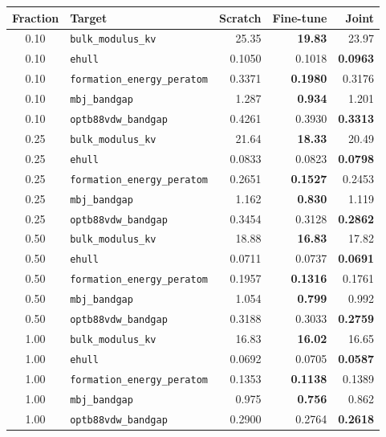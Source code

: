 \documentclass[11pt,a4paper]{article}
\begin{document}
\begin{center}
\small
\begin{tabular}{clrrr}
\toprule
Fraction & Target & Scratch & Fine-tune & Joint \\
\midrule
0.10 & \texttt{bulk\_modulus\_kv} & 25.35 & \textbf{19.83} & 23.97 \\
0.10 & \texttt{ehull} & 0.1050 & 0.1018 & \textbf{0.0963} \\
0.10 & \texttt{formation\_energy\_peratom} & 0.3371 & \textbf{0.1980} & 0.3176 \\
0.10 & \texttt{mbj\_bandgap} & 1.287 & \textbf{0.934} & 1.201 \\
0.10 & \texttt{optb88vdw\_bandgap} & 0.4261 & 0.3930 & \textbf{0.3313} \\
\midrule
0.25 & \texttt{bulk\_modulus\_kv} & 21.64 & \textbf{18.33} & 20.49 \\
0.25 & \texttt{ehull} & 0.0833 & 0.0823 & \textbf{0.0798} \\
0.25 & \texttt{formation\_energy\_peratom} & 0.2651 & \textbf{0.1527} & 0.2453 \\
0.25 & \texttt{mbj\_bandgap} & 1.162 & \textbf{0.830} & 1.119 \\
0.25 & \texttt{optb88vdw\_bandgap} & 0.3454 & 0.3128 & \textbf{0.2862} \\
\midrule
0.50 & \texttt{bulk\_modulus\_kv} & 18.88 & \textbf{16.83} & 17.82 \\
0.50 & \texttt{ehull} & 0.0711 & 0.0737 & \textbf{0.0691} \\
0.50 & \texttt{formation\_energy\_peratom} & 0.1957 & \textbf{0.1316} & 0.1761 \\
0.50 & \texttt{mbj\_bandgap} & 1.054 & \textbf{0.799} & 0.992 \\
0.50 & \texttt{optb88vdw\_bandgap} & 0.3188 & 0.3033 & \textbf{0.2759} \\
\midrule
1.00 & \texttt{bulk\_modulus\_kv} & 16.83 & \textbf{16.02} & 16.65 \\
1.00 & \texttt{ehull} & 0.0692 & 0.0705 & \textbf{0.0587} \\
1.00 & \texttt{formation\_energy\_peratom} & 0.1353 & \textbf{0.1138} & 0.1389 \\
1.00 & \texttt{mbj\_bandgap} & 0.975 & \textbf{0.756} & 0.862 \\
1.00 & \texttt{optb88vdw\_bandgap} & 0.2900 & 0.2764 & \textbf{0.2618} \\
\bottomrule
\end{tabular}
\end{center}
\end{document}
